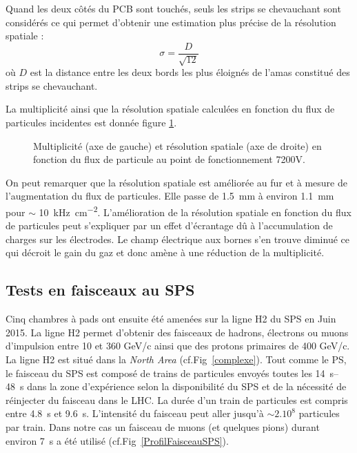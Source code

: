 Quand les deux côtés du PCB sont touchés, seuls les strips se chevauchant sont considérés ce qui permet d'obtenir une estimation plus précise de la résolution spatiale :
\begin{equation}
\sigma=\frac{D}{\sqrt{12}}
\end{equation} 
où $D$ est la distance entre les deux bords les plus éloignés de l'amas constitué des strips se chevauchant.

La multiplicité ainsi que la résolution spatiale calculées en fonction du flux de particules incidentes est donnée figure \ref{ResoSpatialPS}. 

\begin{figure}[!ht]
	\centering
	\caption{Multiplicité (axe de gauche) et résolution spatiale (axe de droite) en fonction du flux de particule au point de fonctionnement 7200V.}
	\label{ResoSpatialPS}
\end{figure}

On peut remarquer que la résolution spatiale est améliorée au fur et à mesure de l'augmentation du flux de particules. Elle passe de \SI{1.5}{\milli\meter} à environ \SI{1.1}{\milli\meter} pour $\sim$ \SI{10}{\kilo\hertz\per\square\centi\meter}. L'amélioration de la résolution spatiale en fonction du flux de particules peut s'expliquer par un effet d'écrantage dû à l'accumulation de charges sur les électrodes. Le champ électrique aux bornes s'en trouve diminué ce qui décroit le gain du gaz et donc amène à une réduction de la multiplicité.

\subsection{Tests en faisceaux au SPS} 
Cinq chambres à pads ont ensuite été amenées sur la ligne H2 \cite{H2line} du SPS en Juin 2015. La ligne H2 permet d'obtenir des faisceaux de hadrons, électrons ou muons d'impulsion entre 10 et 360 GeV/c ainsi que des protons primaires de 400 GeV/c. La ligne H2 est situé dans la \textit{North Area} (cf.Fig~\ref{complexe}). Tout comme le PS, le faisceau du SPS est composé de trains de particules envoyés toutes les \SIrange{14}{48}{\second} dans la zone d’expérience selon la disponibilité du SPS et de la nécessité de réinjecter du faisceau dans le LHC. La durée d’un train de particules est compris entre \SI{4.8}{\second} et \SI{9.6}{\second}. L'intensité du faisceau peut aller jusqu'à $\sim 2.10^{8}$ particules par train. Dans notre cas un faisceau de muons (et quelques pions) durant environ \SI{7}{\second} a été utilisé (cf.Fig~\ref{ProfilFaisceauSPS}).

